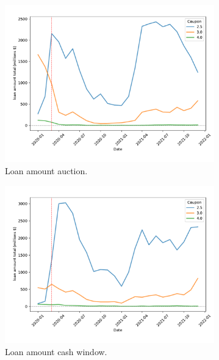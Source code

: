 \documentclass[11pt,a4paper]{article}
\begin{document}
\begin{figure}[]
  \centering
     \begin{subfigure}[b]{0.49\textwidth}
      \includegraphics[width=0.998\textwidth]{../results/figures/LoanAmount_sum_mat30_loan1_timeseries_cpmonthly_2.5_4_auction.pdf}
      \caption{Loan amount auction.}
     \end{subfigure}
      \begin{subfigure}[b]{0.49\textwidth}
        \includegraphics[width=0.998\textwidth]{../results/figures/LoanAmount_sum_mat30_loan1_timeseries_cpmonthly_2.5_4_cash_window.pdf}
        \caption{Loan amount cash window.}
        \end{subfigure}
     \begin{subfigure}[b]{0.49\textwidth}

\end{subfigure}
\end{figure}
\end{document}
